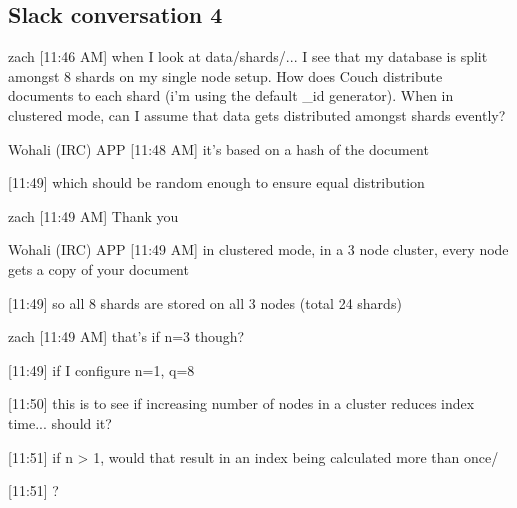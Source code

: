 \subsection{Slack conversation 4}
\label{appendix:slack4}
zach [11:46 AM]
when I look at data/shards/... I see that my database is split amongst 8 shards on my single node setup. How does Couch distribute documents to each shard (i'm using the default _id generator). When in clustered mode, can I assume that data gets distributed amongst shards evently?

Wohali (IRC) APP [11:48 AM]
it's based on a hash of the document

[11:49]
which should be random enough to ensure equal distribution

zach [11:49 AM]
Thank you

Wohali (IRC) APP [11:49 AM]
in clustered mode, in a 3 node cluster, every node gets a copy of your document

[11:49]
so all 8 shards are stored on all 3 nodes (total 24 shards)

zach [11:49 AM]
that's if n=3 though?

[11:49]
if I configure n=1, q=8

    [11:50]
this is to see if increasing number of nodes in a cluster reduces index time... should it?

[11:51]
if n > 1, would that result in an index being calculated more than once/

[11:51]
?